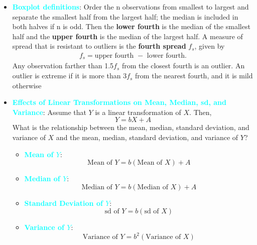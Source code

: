 \documentclass{report}
\begin{document}
\begin{itemize}
        \item \textbf{\textcolor{cyan}{Boxplot definitions}}:
            \bigbreak \noindent 
            Order the n observations from smallest to largest and separate the smallest half
            from the largest half; the median is included in both halves if n is odd. Then
            the \textbf{lower fourth} is the median of the smallest half and the \textbf{upper fourth} is
            the median of the largest half. A measure of spread that is resistant to outliers
            is the \textbf{fourth spread} $f_{s}$, given by
            \begin{align*}
                f_{s} = \text{upper fourth } - \text{ lower fourth}
            .\end{align*}
            \bigbreak \noindent 
            Any observation farther than 1.5$f_{s}$ from the closest fourth is an outlier. An outlier
            is extreme if it is more than $3f_{s}$ from the nearest fourth, and it is mild otherwise
        \item \textbf{\textcolor{cyan}{Effects of Linear Transformations on Mean, Median, sd, and Variance}}:
            Assume that \( Y \) is a linear transformation of \( X \). Then,
            \bigbreak \noindent
            \[
                Y = bX + A
            \]
            \bigbreak \noindent 
            What is the relationship between the mean, median, standard deviation, and variance of \( X \) and the mean, median, standard deviation, and variance of \( Y \)?
            \begin{itemize}
                \item \textbf{\textcolor{cyan}{Mean of \( Y \)}}: 
                    \[
                        \text{Mean of } Y = b (\text{Mean of } X) + A
                    \]
                \item \textbf{\textcolor{cyan}{Median of \( Y \)}}: 
                    \[
                        \text{Median of } Y = b (\text{Median of } X) + A
                    \]
                \item \textbf{\textcolor{cyan}{Standard Deviation of \( Y \)}}: 
                    \[
                        \text{sd of } Y = b (\text{sd of } X)
                    \]
                \item \textbf{\textcolor{cyan}{Variance of \( Y \)}}: 
                    \[
                        \text{Variance of } Y = b^2 (\text{Variance of } X)
                    \]
            \end{itemize}






\end{itemize}
\end{document}
